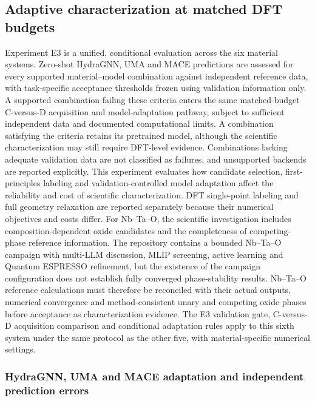 \documentclass[11pt,a4paper]{article}
\def\ac#1{#1}%
\begin{document}
\subsection{Adaptive characterization at matched DFT budgets}
\label{sec:results_active}
Experiment E3 is a unified, conditional evaluation across the six material systems. Zero-shot HydraGNN, UMA and MACE predictions are assessed for every supported material--model combination against independent reference data, with task-specific acceptance thresholds frozen using validation information only. A supported combination failing these criteria enters the same matched-budget C-versus-D acquisition and model-adaptation pathway, subject to sufficient independent data and documented computational limits. A combination satisfying the criteria retains its pretrained model, although the scientific characterization may still require DFT-level evidence. Combinations lacking adequate validation data are not classified as failures, and unsupported backends are reported explicitly. This experiment evaluates how candidate selection, first-principles labeling and validation-controlled model adaptation affect the reliability and cost of scientific characterization. \ac{DFT} single-point labeling and full geometry relaxation are reported separately because their numerical objectives and costs differ.
For Nb--Ta--O, the scientific investigation includes composition-dependent oxide candidates and the completeness of competing-phase reference information. The repository contains a bounded Nb--Ta--O campaign with multi-LLM discussion, MLIP screening, active learning and Quantum ESPRESSO refinement, but the existence of the campaign configuration does not establish fully converged phase-stability results. Nb--Ta--O reference calculations must therefore be reconciled with their actual outputs, numerical convergence and method-consistent unary and competing oxide phases before acceptance as characterization evidence. The E3 validation gate, C-versus-D acquisition comparison and conditional adaptation rules apply to this sixth system under the same protocol as the other five, with material-specific numerical settings.\par
\subsubsection{HydraGNN, UMA and MACE adaptation and independent prediction errors}
\label{sec:results:finetune}
\end{document}

